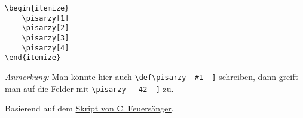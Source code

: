 			\begin{verbatim}
\begin{itemize}
    \pisarzy[1]
    \pisarzy[2]
    \pisarzy[3]
    \pisarzy[4]
\end{itemize}
			\end{verbatim}
			
			\begin{itemize}
				\pisarzy[1]
				\pisarzy[2]
				\pisarzy[3]
				\pisarzy[4]
			\end{itemize}
			
			\emph{Anmerkung:} Man könnte hier auch \verb|\def\pisarzy--#1--]| schreiben, dann greift man auf die Felder mit \verb|\pisarzy --42--]| zu.
			
			Basierend auf dem \href{http://pgfplots.sourceforge.net/TeX-programming-notes.pdf}{Skript von C. Feuersänger}.

